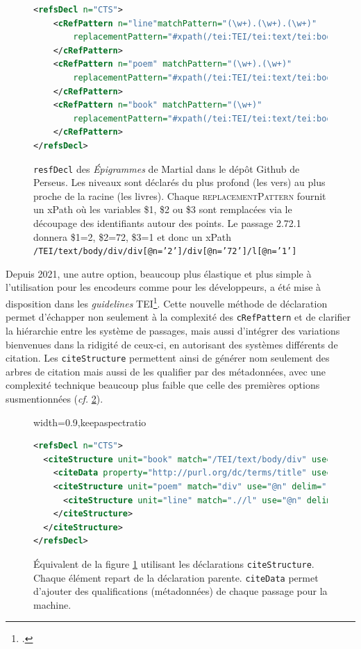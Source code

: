 \begin{figure}[ht]
    \centering
    \lstset{language=XML}
    \begin{lstlisting}[language=XML]
<refsDecl n="CTS">
    <cRefPattern n="line"matchPattern="(\w+).(\w+).(\w+)"
        replacementPattern="#xpath(/tei:TEI/tei:text/tei:body/tei:div/tei:div[@n='$1']/tei:div[@n='$2']/tei:l[@n='$3'])">
    </cRefPattern>
    <cRefPattern n="poem" matchPattern="(\w+).(\w+)"
        replacementPattern="#xpath(/tei:TEI/tei:text/tei:body/tei:div/tei:div[@n='$1']/tei:div[@n='$2'])">
    </cRefPattern>
    <cRefPattern n="book" matchPattern="(\w+)"
        replacementPattern="#xpath(/tei:TEI/tei:text/tei:body/tei:div/tei:div[@n='$1'])">
    </cRefPattern>
</refsDecl>
    \end{lstlisting}
    \caption{\texttt{resfDecl} des \textit{Épigrammes} de Martial dans le dépôt Github de Perseus. Les niveaux sont déclarés du plus profond (les vers) au plus proche de la racine (les livres). Chaque \textsc{replacementPattern} fournit un xPath où les variables \$1, \$2 ou \$3 sont remplacées via le découpage des identifiants autour des points. Le passage 2.72.1 donnera \$1=2, \$2=72, \$3=1 et donc un xPath \texttt{/TEI/text/body/div/div[@n='2']/div[@n='72']/l[@n='1']}}
    \label{chap1:xml:cRefPattern}
\end{figure}

Depuis 2021, une autre option, beaucoup plus élastique et plus simple à l'utilisation pour les encodeurs comme pour les développeurs, a été mise à disposition dans les \textit{guidelines} TEI\footcite{cayless_introducing_2021}. Cette nouvelle méthode de déclaration permet d'échapper non seulement à la complexité des \texttt{cRefPattern} et de clarifier la hiérarchie entre les système de passages, mais aussi d'intégrer des variations bienvenues dans la ridigité de ceux-ci, en autorisant des systèmes différents de citation. Les \texttt{citeStructure} permettent ainsi de générer nom seulement des arbres de citation mais aussi de les qualifier par des métadonnées, avec une complexité technique beaucoup plus faible que celle des premières options susmentionnées (\textit{cf.} \ref{chap1:xml:citeStructure}).

\begin{figure}[ht]
    \centering
    \begin{adjustbox}{width=0.9\textwidth,keepaspectratio}
    \lstset{language=XML}
    \begin{lstlisting}[language=XML]
<refsDecl n="CTS">
  <citeStructure unit="book" match="/TEI/text/body/div" use="@n">
    <citeData property="http://purl.org/dc/terms/title" use="head"/>
    <citeStructure unit="poem" match="div" use="@n" delim=".">
      <citeStructure unit="line" match=".//l" use="@n" delim="."/>
    </citeStructure>
  </citeStructure>
</refsDecl>
    \end{lstlisting}
    \end{adjustbox}
    \caption{Équivalent de la figure \ref{chap1:xml:cRefPattern} utilisant les déclarations \texttt{citeStructure}. Chaque élément repart de la déclaration parente. \texttt{citeData} permet d'ajouter des qualifications (métadonnées) de chaque passage pour la machine.}
    \label{chap1:xml:citeStructure}
\end{figure}

